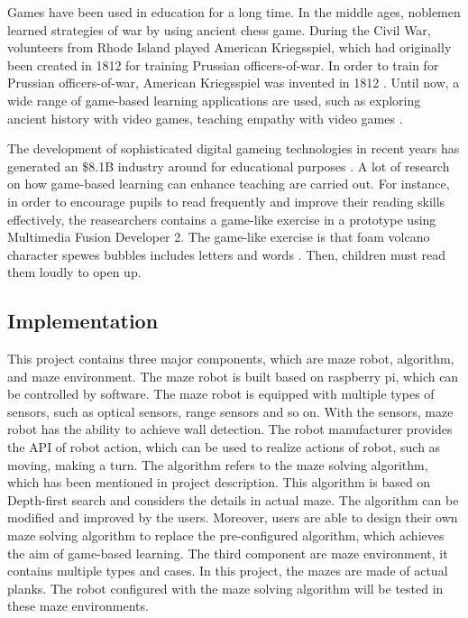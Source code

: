 \documentclass[11pt,times,oneside,openright,hardcopy]{eeereport}
\begin{document}
Games have been used in education for a long time. In the middle ages, noblemen learned strategies of war by using ancient chess game. 
During the Civil War, volunteers from Rhode Island played American Kriegsspiel, which had originally been created in 1812 for training Prussian officers-of-war.
In order to train for Prussian officers-of-war, American Kriegsspiel was invented in 1812 \cite{Fenn:2014dm}.
Until now, a wide range of game-based learning applications are used, such as exploring ancient history with video games,
teaching empathy with video games \cite{Prensky:2007wt}.

The development of sophisticated digital gameing technologies in recent years has generated an \$8.1B industry around for educational purposes \cite{An:2018uv}. 
A lot of research on how game-based learning can enhance teaching are carried out. For instance, in order to encourage pupils to read frequently and
improve their reading skills effectively, the reasearchers contains a game-like exercise in a prototype using Multimedia Fusion Developer 2.
The game-like exercise is that foam volcano character spewes bubbles includes letters and words \cite{AdrirScott:2013ui}. Then, children must read them loudly to open up.


\subsection{Implementation}
This project contains three major components, which are maze robot, algorithm, and maze environment.
The maze robot is built based on raspberry pi, which can be controlled by software. The maze robot is equipped with multiple types of sensors, such as optical sensors, range sensors and so on. With the sensors, maze robot has the ability to achieve wall detection. The robot manufacturer provides the API of robot action, which can be used to realize actions of robot, such as moving, making a turn.
The algorithm refers to the maze solving algorithm, which has been mentioned in project description. This algorithm is based on Depth-first search and considers the details in actual maze. The algorithm can be modified and improved by the users. Moreover, users are able to design their own maze solving algorithm to replace the pre-configured algorithm, which achieves the aim of game-based learning.
The third component are maze environment, it contains multiple types and cases. In this project, the mazes are made of actual planks. The robot configured with the maze solving algorithm will be tested in these maze environments.
\end{document}
